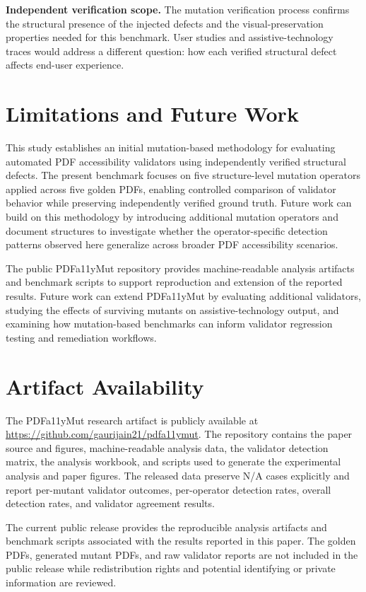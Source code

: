 \documentclass[conference]{IEEEtran}
\begin{document}
\textbf{Independent verification scope.} The mutation verification process confirms the structural presence of the injected defects and the visual-preservation properties needed for this benchmark. User studies and assistive-technology traces would address a different question: how each verified structural defect affects end-user experience.

\section{Limitations and Future Work}

This study establishes an initial mutation-based methodology for evaluating
automated PDF accessibility validators using independently verified structural
defects. The present benchmark focuses on five structure-level mutation
operators applied across five golden PDFs, enabling controlled comparison of
validator behavior while preserving independently verified ground truth.
Future work can build on this methodology by introducing additional mutation
operators and document structures to investigate whether the operator-specific
detection patterns observed here generalize across broader PDF accessibility
scenarios.

The public PDFa11yMut repository provides machine-readable analysis artifacts
and benchmark scripts to support reproduction and extension of the reported
results. Future work can extend PDFa11yMut by evaluating additional validators,
studying the effects of surviving mutants on assistive-technology output, and
examining how mutation-based benchmarks can inform validator regression testing
and remediation workflows.

\section{Artifact Availability}

The PDFa11yMut research artifact is publicly available at
\url{https://github.com/gaurijain21/pdfa11ymut}.
The repository contains the paper source and figures, machine-readable
analysis data, the validator detection matrix, the analysis workbook,
and scripts used to generate the experimental analysis and paper
figures. The released data preserve N/A cases explicitly and report
per-mutant validator outcomes, per-operator detection rates, overall
detection rates, and validator agreement results.

The current public release provides the reproducible analysis artifacts
and benchmark scripts associated with the results reported in this paper.
The golden PDFs, generated mutant PDFs, and raw validator reports are not
included in the public release while redistribution rights and potential
identifying or private information are reviewed.
\end{document}
